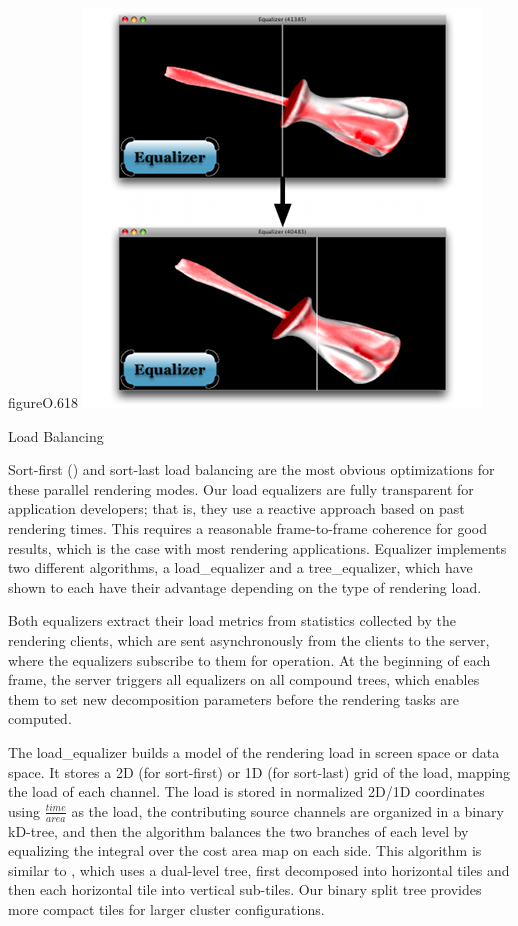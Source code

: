 \begin{wrapfloat}{figure}{O}{.618\textwidth}
  \includegraphics[width=.618\textwidth]{images/loadeq}
  \caption{\label{floadeq}Load Balancing}
\end{wrapfloat}

Sort-first () and sort-last load balancing are the most obvious
optimizations for these parallel rendering modes. Our load equalizers are fully
transparent for application developers; that is, they use a reactive approach
based on past rendering times. This requires a reasonable frame-to-frame
coherence for good results, which is the case with most rendering applications.
Equalizer implements two different algorithms, a \textsf{load\_equalizer} and a
\textsf{tree\_equalizer}, which have shown to each have their advantage
depending on the type of rendering load.

Both equalizers extract their load metrics from statistics collected by the
rendering clients, which are sent asynchronously from the clients to the
server, where the equalizers subscribe to them for operation. At the beginning
of each frame, the server triggers all equalizers on all compound trees, which
enables them to set new decomposition parameters before the rendering tasks are
computed.

The \textsf{load\_equalizer} builds a model of the rendering load in screen
space or data space. It stores a 2D (for sort-first) or 1D (for sort-last) grid
of the load, mapping the load of each channel. The load is stored in normalized
2D/1D coordinates using $\frac{time}{area}$ as the load, the contributing source
channels are organized in a binary kD-tree, and then the algorithm balances the
two branches of each level by equalizing the integral over the cost area map on
each side. This algorithm is similar to \cite{ACCC:04}, which uses a dual-level
tree, first decomposed into horizontal tiles and then each horizontal tile into
vertical sub-tiles. Our binary split tree provides more compact tiles for larger
cluster configurations.

